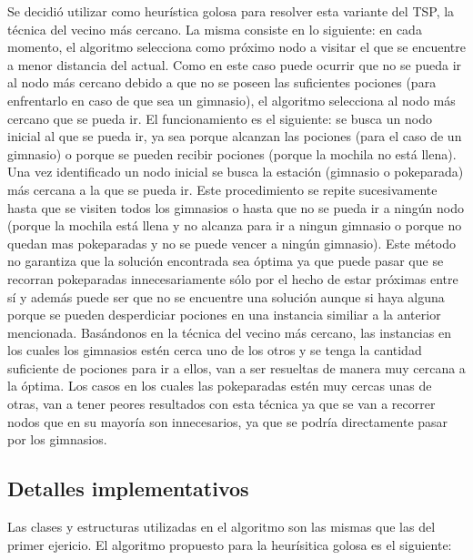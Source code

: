         Se decidió utilizar como heurística golosa para resolver esta variante del TSP, la técnica del vecino más cercano. La misma consiste en lo siguiente: en cada momento, el algoritmo selecciona como próximo nodo a visitar el que se encuentre a menor distancia del actual. Como en este caso puede ocurrir que no se pueda ir al nodo más cercano debido a que no se poseen las suficientes pociones (para enfrentarlo en caso de que sea un gimnasio), el algoritmo selecciona al nodo más cercano que se pueda ir. El funcionamiento es el siguiente: se busca un nodo inicial al que se pueda ir, ya sea porque alcanzan las pociones (para el caso de un gimnasio) o porque se pueden recibir pociones (porque la mochila no está llena). Una vez identificado un nodo inicial se busca la estación (gimnasio o pokeparada) más cercana a la que se pueda ir. Este procedimiento se repite sucesivamente hasta que se visiten todos los gimnasios o hasta que no se pueda ir a ningún nodo (porque la mochila está llena y no alcanza para ir a ningun gimnasio o porque no quedan mas pokeparadas y no se puede vencer a ningún gimnasio).
        Este método no garantiza que la solución encontrada sea óptima ya que puede pasar que se recorran pokeparadas innecesariamente sólo por el hecho de estar próximas entre sí y además puede ser que no se encuentre una solución aunque si haya alguna porque se pueden desperdiciar pociones en una instancia similiar a la anterior mencionada.
        Basándonos en la técnica del vecino más cercano, las instancias en los cuales los gimnasios estén cerca uno de los otros y se tenga la cantidad suficiente de pociones para ir a ellos, van a ser resueltas de manera muy cercana a la óptima. Los casos en los cuales las pokeparadas estén muy cercas unas de otras, van a tener peores resultados con esta técnica ya que se van a recorrer nodos que en su mayoría son innecesarios, ya que se podría directamente pasar por los gimnasios.

        \subsection{Detalles implementativos}
            Las clases y estructuras utilizadas en el algoritmo son las mismas que las del primer ejericio. El algoritmo propuesto para la heurísitica golosa es el siguiente: 

